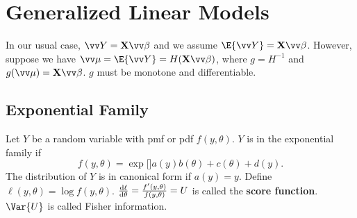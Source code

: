 \section*{Generalized Linear Models}
In our usual case, $ \Vector{Y}=\Matrix{X}\Vector{\beta} $
and we assume $ \E{\Vector{Y}}=\Matrix{X}\Vector{\beta} $. However,
suppose we have $ \Vector{\mu}=\E{\Vector{Y}}=H(\Matrix{X}\Vector{\beta}) $,
where $ g=H^{-1} $ and $ g(\Vector{\mu})=\Matrix{X}\Vector{\beta} $.
$ g $ must be monotone and differentiable.
\subsection*{Exponential Family}
Let $ Y $ be a random variable with pmf or pdf
$ f(y,\theta) $. $ Y $ is in the exponential family if
\[ f(y,\theta)=\exp[\big]{a(y)b(\theta)+c(\theta)+d(y)}. \]
The distribution of $ Y $ is in canonical form
if $ a(y)=y $. Define $ \ell(y,\theta)=\log{f(y,\theta)} $.
$ \odv{\ell}{\theta}=\frac{f'(y,\theta)}{f(y,\theta)}=U $
is called the \textbf{score function}. $ \Var{U} $
is called Fisher information.

